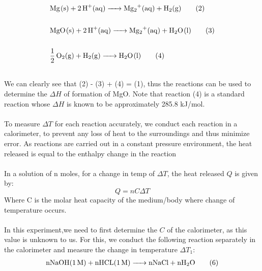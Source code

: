 \begin{align*}
\ce{& Mg(s) + 2H+(aq) -> Mg2+(aq) + H2(g)} \tag{2}\label{2} \\ \\
\ce{& MgO(s)  + 2H+(aq) ->  Mg2+(aq) + H2O(l)} \tag{3}\label{3} \\ \\
\ce{& 1/2O2(g) + H2(g) -> H2O(l)} \tag{4}\label{4} \\ \\
\end{align*}
We can clearly see that (2) - (3) + (4) = (1), thus the reactions can be used to determine the $\Delta H$ of formation of MgO. Note that reaction (4) is a standard reaction whose $\Delta H$ is known to be approximately 285.8 kJ/mol.
 \\ \\
To measure $\Delta T$ for each reaction accurately, we conduct each reaction in a calorimeter, to prevent any loss of heat to the surroundings and thus minimize error. As reactions are carried out in a constant pressure environment, the heat released is equal to the enthalpy change in the reaction
\\ \\
In a solution of n moles, for a change in temp of $\Delta T$, the heat released $Q$ is given by:
\[
  Q = nC\Delta T \tag{5}\label{5}
\]
Where C is the molar heat capacity of the medium/body where change of temperature occurs.
\\ \\
In this experiment,we need to first determine the $C$ of the calorimeter, as this value is unknown to us. For this, we conduct the following reaction separately in the calorimeter and measure the change in temperature $\Delta T_1$:
\begin{align*}
\ce{nNaOH(1M) + nHCL(1M) -> nNaCl + nH2O} \tag{6}\label{6}
\end{align*}

